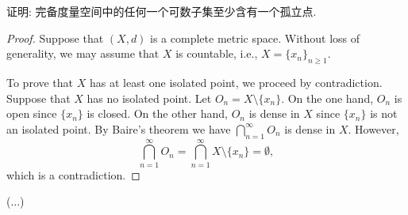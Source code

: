 \begin{exercise}
    证明: 完备度量空间中的任何一个可数子集至少含有一个孤立点.
\end{exercise}

\begin{proof}
  Suppose that $(X,d)$ is a complete metric space.
  Without loss of generality, we may assume that $X$ is countable, i.e., $X = \{x_n\}_{n\geq 1}$.

  To prove that $X$ has at least one isolated point, we proceed by contradiction.
  Suppose that $X$ has no isolated point. Let $O_n = X\setminus \{x_n\}$.
  On the one hand, $O_n$ is open since $\{x_n\}$ is closed.
  On the other hand, $O_n$ is dense in $X$ since $\{x_n\}$ is not an isolated point.
  By Baire's theorem we have
  $\bigcap_{n=1}^\infty O_n$ is dense in $X$.
  However,
  \[\bigcap_{n=1}^\infty O_n = \bigcap_{n=1}^\infty X\setminus\{x_n\} = \emptyset,\]
  which is a contradiction.
\end{proof}


\begin{exercise}
  (...)
\end{exercise}

